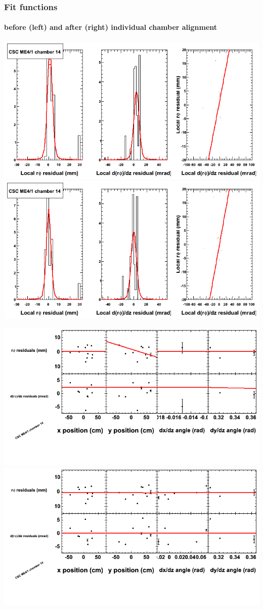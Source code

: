 \documentclass[compress]{beamer}
\begin{document}
\begin{frame}
\frametitle{Fit functions}
\framesubtitle{before (left) and after (right) individual chamber alignment}
\includegraphics[width=0.5\linewidth]{ringfits_3dof/beforefit_MEp41_14_bellcurve.png} \includegraphics[width=0.5\linewidth]{ringfits_3dof/afterfit_MEp41_14_bellcurve.png}

\includegraphics[width=0.5\linewidth]{ringfits_3dof/beforefit_MEp41_14_polynomials.png} \includegraphics[width=0.5\linewidth]{ringfits_3dof/afterfit_MEp41_14_polynomials.png}
\end{frame}
\end{document}

